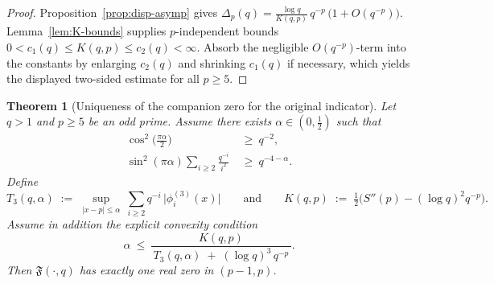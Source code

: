 \documentclass[11pt,a4paper]{amsart}
\theoremstyle{plain}
\newtheorem{theorem}{Theorem}[section]
\theoremstyle{definition}
\theoremstyle{remark}
\begin{document}
\begin{proof}
Proposition~\ref{prop:disp-asymp} gives
\(
\Delta_p(q)=\frac{\log q}{K(q,p)}\,q^{-p}\,\bigl(1+O(q^{-p})\bigr).
\)
Lemma~\ref{lem:K-bounds} supplies $p$-independent bounds
\(
0<c_1(q)\le K(q,p)\le c_2(q)<\infty.
\)
Absorb the negligible $O(q^{-p})$-term into the constants by enlarging $c_2(q)$ and shrinking $c_1(q)$ if necessary, which yields the displayed two-sided estimate for all $p\ge5$.
\end{proof}

\begin{theorem}[Uniqueness of the companion zero for the original indicator]\label{thm:uniq-companion-F}
Let $q>1$ and $p\ge5$ be an odd prime. Assume there exists $\alpha\in(0,\tfrac12)$ such that
\begin{align}
\cos^2\!\Big(\tfrac{\pi\alpha}{2}\Big)\ &\ge\ q^{-2}, \tag{L0}\label{cond:L0}\\
\sin^2(\pi\alpha)\!\!\sum_{i\ge2}\frac{q^{-i}}{i^2}\ &\ge\ q^{-4-\alpha}. \tag{M0}\label{cond:M0}
\end{align}
Define
\[
T_3(q,\alpha)\;:=\;\sup_{|x-p|\le \alpha}\ \sum_{i\ge2} q^{-i}\, \big|\phi_i^{(3)}(x)\big|
\qquad\text{and}\qquad 
K(q,p)\;:=\;\tfrac12\Big(S''(p)-(\log q)^2 q^{-p}\Big).
\]
Assume in addition the explicit convexity condition
\begin{equation}\tag{C0}\label{cond:C0}
\alpha\ \le\ \frac{K(q,p)}{\,T_3(q,\alpha)\;+\;(\log q)^3\,q^{-p}\,}.
\end{equation}
Then $\mathfrak F(\cdot,q)$ has exactly one real zero in $(p-1,p)$.
\end{theorem}
\end{document}
